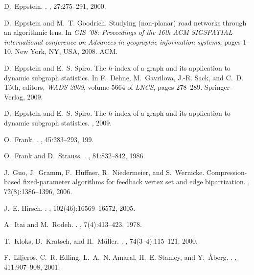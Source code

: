 \documentclass[11pt]{article}
\begin{document}
\begin{thebibliography}{10}
D.~Eppstein.
.
, 27:275{--}291, 2000.

D.~Eppstein and M.~T. Goodrich.
\newblock Studying (non-planar) road networks through an algorithmic lens.
\newblock In {\em GIS '08: Proceedings of the 16th ACM SIGSPATIAL international
  conference on Advances in geographic information systems}, pages 1--10, New
  York, NY, USA, 2008. ACM.

D.~Eppstein and E.~S. Spiro.
\newblock The $h$-index of a graph and its application to dynamic subgraph
  statistics.
\newblock In F.~Dehne, M.~Gavrilova, J.-R. Sack, and C.~D. T{\'o}th, editors,
  {\em WADS 2009}, volume 5664 of {\em LNCS}, pages 278--289. Springer-Verlag,
  2009.

D.~Eppstein and E.~S. Spiro.
\newblock The $h$-index of a graph and its application to dynamic subgraph
  statistics.
, 2009.

O.~Frank.
.
, 45:283{--}293, 199.

O.~Frank and D.~Strauss.
.
, 81:832{--}842, 1986.

J.~Guo, J.~Gramm, F.~H\"{u}ffner, R.~Niedermeier, and S.~Wernicke.
\newblock Compression-based fixed-parameter algorithms for feedback vertex set
  and edge bipartization.
, 72(8):1386--1396, 2006.

J.~E. Hirsch.
.
, 102(46):16569{--}16572,
  2005.

A.~Itai and M.~Rodeh.
.
, 7(4):413{--}423, 1978.

T.~Kloks, D.~Kratsch, and H.~M{\"u}ller.
.
, 74(3{--}4):115{--}121, 2000.

F.~Liljeros, C.~R. Edling, L.~A.~N. Amaral, H.~E. Stanley, and Y.~{\AA}berg.
.
, 411:907{--}908, 2001.


\end{thebibliography}
\end{document}
